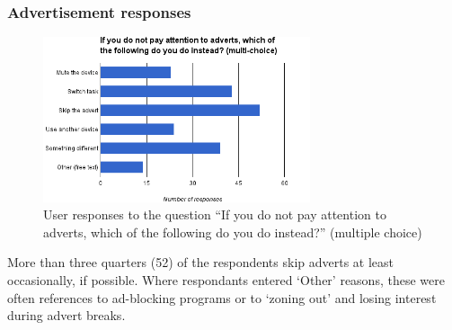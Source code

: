 \subsubsection{Advertisement responses}
\label{sec:prestudy_alternatives}
\begin{figure}[H]
	\centering
	\vspace{-10pt}
	\includegraphics[width=0.7\textwidth, clip=true, trim=0 0 0 55pt]{images/prestudy_alternatives.png}
	\caption{User responses to the question ``If you do not pay attention to adverts, which of the following do you do instead?'' (multiple choice)}
	\label{fig:prestudy_alternatives}
	\vspace{-25pt}
\end{figure}
More than three quarters (52) of the respondents skip adverts at least occasionally, if possible. Where respondants entered `Other' reasons, these were often references to ad-blocking programs or to `zoning out' and losing interest during advert breaks.
